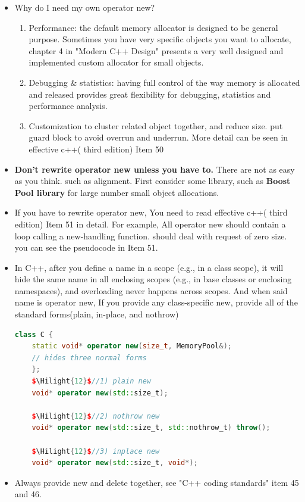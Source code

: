 \documentclass[a4paper,11pt,twoside]{book}
\newcommand{\Hilight}[1]{\makebox[0pt][l]{\color{yellow}\rule[-3pt]{#1em}{11pt}}}
\newcommand{\Hilight}[1]{}
\begin{document}
\begin{itemize}
	\item Why do I need my own operator new?
	\begin{enumerate}
		\item Performance: the default memory allocator is designed to be general purpose. Sometimes you have very specific objects you want to allocate, chapter 4 in "Modern C++ Design" presents a very well designed and implemented custom allocator for small objects.
		
		\item Debugging \& statistics: having full control of the way memory is allocated and released provides great flexibility for debugging, statistics and performance analysis.
		
		\item Customization to cluster related object together, and reduce size. put guard block to avoid overrun and underrun. More detail can be seen in effective c++( third edition) Item 50
	\end{enumerate}
	
	\item \textbf{Don't rewrite operator new unless you have to.} There are not as easy as you think. such as alignment. First consider some library, such as \textbf{Boost Pool library} for large number small object allocations. 
	
	\item If you have to rewrite operator new, You need to read  effective c++( third edition) Item 51 in detail. For example, All operator new should contain a loop calling a new-handling function.  should deal with request of zero size. you can see the pseudocode in Item 51.
	
	\item In C++, after you define a name in a scope (e.g., in a class scope), it will hide the same name in all enclosing scopes (e.g., in base classes or enclosing namespaces), and overloading never happens across scopes. And when said name is operator new, If you provide any class-specific new, provide all of the standard forms(plain, in-place, and nothrow)
	\begin{lstlisting}[frame=single, language=c++, mathescape=true]
	class C {
	static void* operator new(size_t, MemoryPool&);
	// hides three normal forms
	};
	$\Hilight{12}$//1) plain new
	void* operator new(std::size_t);
	
	$\Hilight{12}$//2) nothrow new
	void* operator new(std::size_t, std::nothrow_t) throw();
	
	$\Hilight{12}$//3) inplace new
	void* operator new(std::size_t, void*);
	\end{lstlisting}
	
	\item Always provide new and delete together, see "C++ coding standards" item 45 and 46.
\end{itemize}
\end{document}

